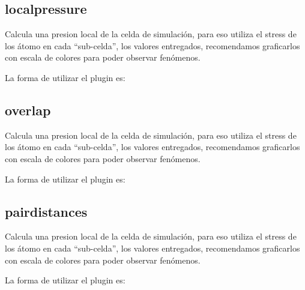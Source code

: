 \subsection{localpressure}

Calcula una presion local de la celda de simulaci\'on, para eso utiliza el stress de los \'atomo en cada ``sub-celda'', los valores entregados, recomendamos graficarlos con escala de colores para poder observar fen\'omenos. 

La forma de utilizar el plugin es:

\subsection{overlap}

Calcula una presion local de la celda de simulaci\'on, para eso utiliza el stress de los \'atomo en cada ``sub-celda'', los valores entregados, recomendamos graficarlos con escala de colores para poder observar fen\'omenos. 

La forma de utilizar el plugin es:

\subsection{pairdistances}

Calcula una presion local de la celda de simulaci\'on, para eso utiliza el stress de los \'atomo en cada ``sub-celda'', los valores entregados, recomendamos graficarlos con escala de colores para poder observar fen\'omenos. 

La forma de utilizar el plugin es:

